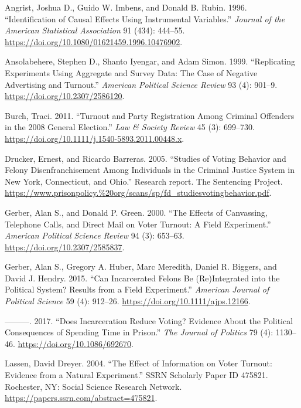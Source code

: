 \documentclass[
  12pt,
]{article}
\newlength{\cslhangindent}
\newenvironment{cslreferences}%
  {\setlength{\parindent}{0pt}%
  \everypar{\setlength{\hangindent}{\cslhangindent}}\ignorespaces}%
  {\par}
\begin{document}
\hypertarget{refs}{}
\begin{cslreferences}
\leavevmode\hypertarget{ref-Angrist1996}{}%
Angrist, Joshua D., Guido W. Imbens, and Donald B. Rubin. 1996. ``Identification of Causal Effects Using Instrumental Variables.'' \emph{Journal of the American Statistical Association} 91 (434): 444--55. \url{https://doi.org/10.1080/01621459.1996.10476902}.

\leavevmode\hypertarget{ref-Ansolabehere1999}{}%
Ansolabehere, Stephen D., Shanto Iyengar, and Adam Simon. 1999. ``Replicating Experiments Using Aggregate and Survey Data: The Case of Negative Advertising and Turnout.'' \emph{American Political Science Review} 93 (4): 901--9. \url{https://doi.org/10.2307/2586120}.

\leavevmode\hypertarget{ref-Burch2011}{}%
Burch, Traci. 2011. ``Turnout and Party Registration Among Criminal Offenders in the 2008 General Election.'' \emph{Law \& Society Review} 45 (3): 699--730. \url{https://doi.org/10.1111/j.1540-5893.2011.00448.x}.

\leavevmode\hypertarget{ref-Drucker2005}{}%
Drucker, Ernest, and Ricardo Barreras. 2005. ``Studies of Voting Behavior and Felony Disenfranchisement Among Individuals in the Criminal Justice System in New York, Connecticut, and Ohio.'' Research report. The Sentencing Project. \url{https://www.prisonpolicy.\%20org/scans/sp/fd_studiesvotingbehavior.pdf}.

\leavevmode\hypertarget{ref-Gerber2000}{}%
Gerber, Alan S., and Donald P. Green. 2000. ``The Effects of Canvassing, Telephone Calls, and Direct Mail on Voter Turnout: A Field Experiment.'' \emph{American Political Science Review} 94 (3): 653--63. \url{https://doi.org/10.2307/2585837}.

\leavevmode\hypertarget{ref-Gerber2015}{}%
Gerber, Alan S., Gregory A. Huber, Marc Meredith, Daniel R. Biggers, and David J. Hendry. 2015. ``Can Incarcerated Felons Be (Re)Integrated into the Political System? Results from a Field Experiment.'' \emph{American Journal of Political Science} 59 (4): 912--26. \url{https://doi.org/10.1111/ajps.12166}.

\leavevmode\hypertarget{ref-Gerber2017}{}%
---------. 2017. ``Does Incarceration Reduce Voting? Evidence About the Political Consequences of Spending Time in Prison.'' \emph{The Journal of Politics} 79 (4): 1130--46. \url{https://doi.org/10.1086/692670}.

\leavevmode\hypertarget{ref-Lassen2004}{}%
Lassen, David Dreyer. 2004. ``The Effect of Information on Voter Turnout: Evidence from a Natural Experiment.'' SSRN Scholarly Paper ID 475821. Rochester, NY: Social Science Research Network. \url{https://papers.ssrn.com/abstract=475821}.


\end{cslreferences}
\end{document}
